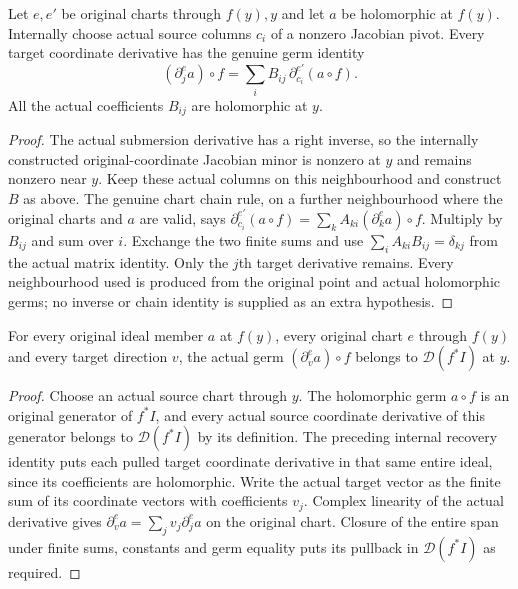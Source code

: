 \begin{lemma}\label{hir:submersion-actual-coordinate-derivative-recovery}
Let $e,e'$ be original charts through $f(y),y$ and let $a$ be holomorphic
at $f(y)$. Internally choose actual source columns $c_i$ of a nonzero
Jacobian pivot. Every target coordinate derivative has the genuine germ identity
\[
 (\partial_j^e a)\circ f
 =\sum_i B_{ij}\,\partial_{c_i}^{e'}(a\circ f).
\]
All the actual coefficients $B_{ij}$ are holomorphic at $y$.
\leanok
{}
\end{lemma}
\begin{proof}
The actual submersion derivative has a right inverse, so the internally
constructed original-coordinate Jacobian minor is nonzero at $y$ and remains
nonzero near $y$. Keep these actual columns on this neighbourhood and construct
$B$ as above. The genuine chart chain rule, on a further neighbourhood where
the original charts and $a$ are valid, says
$\partial_{c_i}^{e'}(a\circ f)=\sum_k A_{ki}(\partial_k^e a)\circ f$.
Multiply by $B_{ij}$ and sum over $i$. Exchange the two finite sums and use
$\sum_i A_{ki}B_{ij}=\delta_{kj}$ from the actual matrix identity.
Only the $j$th target derivative remains. Every neighbourhood used is produced
from the original point and actual holomorphic germs; no inverse or chain
identity is supplied as an extra hypothesis.
\end{proof}

\begin{lemma}\label{hir:submersion-actual-directional-derivative-membership}
For every original ideal member $a$ at $f(y)$, every original chart $e$
through $f(y)$ and every target direction $v$, the actual germ
$(\partial_v^e a)\circ f$ belongs to $\mathcal D(f^*I)$ at $y$.
\leanok
{}
\end{lemma}
\begin{proof}
Choose an actual source chart through $y$. The holomorphic germ $a\circ f$
is an original generator of $f^*I$, and every actual source coordinate
derivative of this generator belongs to $\mathcal D(f^*I)$ by its definition.
The preceding internal recovery identity puts each pulled target coordinate
derivative in that same entire ideal, since its coefficients are holomorphic.
Write the actual target vector as the finite sum of its coordinate vectors
with coefficients $v_j$. Complex linearity of the actual derivative gives
$\partial_v^e a=\sum_j v_j\partial_j^e a$ on the original chart.
Closure of the entire span under finite sums, constants and germ equality
puts its pullback in $\mathcal D(f^*I)$ as required.
\end{proof}

